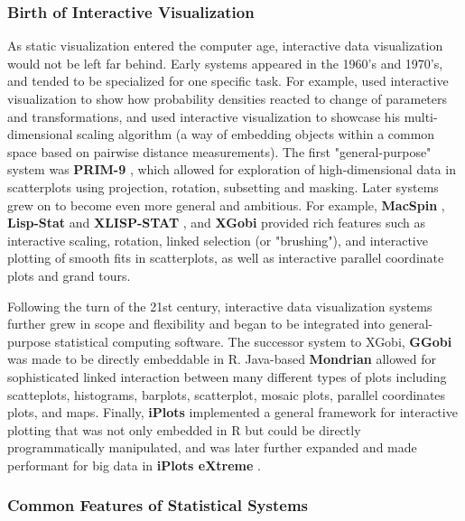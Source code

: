 \documentclass[12pt,a4paper]{article}
\begin{document}
\subsubsection{Birth of Interactive Visualization}

As static visualization entered the computer age, interactive data visualization would not be left far behind. Early systems appeared in the 1960's and 1970's, and tended to be specialized for one specific task. For example, \cite{fowlkes1969} used interactive visualization to show how probability densities reacted to change of parameters and transformations, and \cite{kruskal1964} used interactive visualization to showcase his multi-dimensional scaling algorithm (a way of embedding objects within a common space based on pairwise distance measurements). The first "general-purpose" system was \textbf{PRIM-9} \citep{fisherkeller1974}, which allowed for exploration of high-dimensional data in scatterplots using projection, rotation, subsetting and masking. Later systems grew on to become even more general and ambitious. For example, \textbf{MacSpin} \citep{donoho1988}, \textbf{Lisp-Stat} and \textbf{XLISP-STAT} \citep{tierney1989, tierney2004}, and \textbf{XGobi} \citep{swayne1998} provided rich features such as interactive scaling, rotation, linked selection (or "brushing"), and interactive plotting of smooth fits in scatterplots, as well as interactive parallel coordinate plots and grand tours.

Following the turn of the 21st century, interactive data visualization systems further grew in scope and flexibility and began to be integrated into general-purpose statistical computing software. The successor system to XGobi, \textbf{GGobi} \citep{swayne2003} was made to be directly embeddable in R. Java-based \textbf{Mondrian} \citep{theus2002} allowed for sophisticated linked interaction between many different types of plots including scatteplots, histograms, barplots, scatterplot, mosaic plots, parallel coordinates plots, and maps. Finally, \textbf{iPlots} \citep{urbanek2003} implemented a general framework for interactive plotting that was not only embedded in R but could be directly programmatically manipulated, and was later further expanded and made performant for big data in \textbf{iPlots eXtreme} \citep{urbanek2011}.

\subsubsection{Common Features of Statistical Systems}
\end{document}
